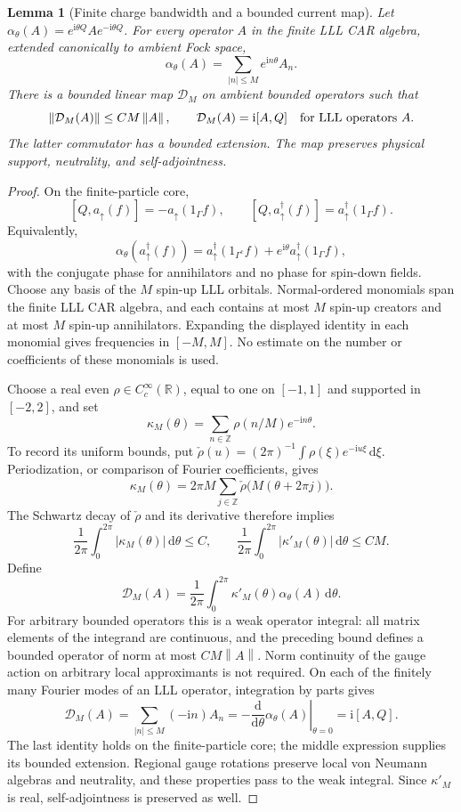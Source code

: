 \documentclass[11pt]{article}
\newtheorem{lemma}[theorem]{Lemma}
\theoremstyle{definition}
\theoremstyle{remark}
\newcommand{\ii}{\mathrm i}
\newcommand{\dd}{\,\mathrm d}
\newcommand{\up}{\uparrow}
\newcommand{\norm}[1]{\left\lVert#1\right\rVert}
\begin{document}
\begin{lemma}[Finite charge bandwidth and a bounded current map]
\label{lem:chargebandwidth}
Let \(\alpha_\theta(A)=e^{\ii\theta Q}Ae^{-\ii\theta Q}\).
For every operator \(A\) in the finite LLL CAR algebra, extended
canonically to ambient Fock space,
\[
 \alpha_\theta(A)=\sum_{|n|\le M}e^{\ii n\theta}A_n.
\]
There is a bounded linear map \(\mathcal D_M\) on ambient bounded
operators such that
\[
 \norm{\mathcal D_M(A)}\le CM\norm A,\qquad
 \mathcal D_M(A)=\ii[A,Q]\quad\hbox{for LLL operators }A.
\]
The latter commutator has a bounded extension.  The map preserves
physical support, neutrality, and self-adjointness.
\end{lemma}
\begin{proof}
On the finite-particle core,
\[
 [Q,a_\up(f)]=-a_\up(1_\Gamma f),\qquad
 [Q,a_\up^\dagger(f)]=a_\up^\dagger(1_\Gamma f).
\]
Equivalently,
\[
 \alpha_\theta(a_\up^\dagger(f))
 =a_\up^\dagger(1_{\Gamma^c}f)
   +e^{\ii\theta}a_\up^\dagger(1_\Gamma f),
\]
with the conjugate phase for annihilators and no phase for
spin-down fields.  Choose any basis of the \(M\) spin-up LLL
orbitals.  Normal-ordered monomials span the finite LLL CAR
algebra, and each contains at most \(M\) spin-up creators and
at most \(M\) spin-up annihilators.  Expanding the displayed
identity in each monomial gives frequencies in \([-M,M]\).
No estimate on the number or coefficients of these monomials is used.

Choose a real even \(\rho\in C_c^\infty(\mathbb R)\), equal
to one on \([-1,1]\) and supported in \([-2,2]\), and set
\[
 \kappa_M(\theta)=\sum_{n\in\mathbb Z}\rho(n/M)e^{-\ii n\theta}.
\]
To record its uniform bounds, put
\(\check\rho(u)=(2\pi)^{-1}\int\rho(\xi)e^{-\ii u\xi}\dd\xi\).
Periodization, or comparison of Fourier coefficients, gives
\[
 \kappa_M(\theta)=2\pi M\sum_{j\in\mathbb Z}
                  \check\rho\bigl(M(\theta+2\pi j)\bigr).
\]
The Schwartz decay of \(\check\rho\) and its derivative therefore
implies
\[
 \frac1{2\pi}\int_0^{2\pi}|\kappa_M(\theta)|\dd\theta\le C,
 \qquad
 \frac1{2\pi}\int_0^{2\pi}|\kappa'_M(\theta)|\dd\theta\le CM.
\]
Define
\[
 \mathcal D_M(A)=\frac1{2\pi}\int_0^{2\pi}
            \kappa'_M(\theta)\alpha_\theta(A)\dd\theta.
\]
For arbitrary bounded operators this is a weak operator integral:
all matrix elements of the integrand are continuous, and the
preceding bound defines a bounded operator of norm at most
\(CM\norm A\).  Norm continuity of the gauge action on arbitrary
local approximants is not required.  On each of the finitely many
Fourier modes of an LLL operator, integration by parts gives
\[
 \mathcal D_M(A)=\sum_{|n|\le M}(-\ii n)A_n
 =-\left.\frac{\mathrm d}{\mathrm d\theta}
                  \alpha_\theta(A)\right|_{\theta=0}
 =\ii[A,Q].
\]
The last identity holds on the finite-particle core; the middle
expression supplies its bounded extension.  Regional gauge rotations
preserve local von Neumann algebras and neutrality, and these
properties pass to the weak integral.  Since \(\kappa'_M\) is
real, self-adjointness is preserved as well.
\end{proof}
\end{document}
